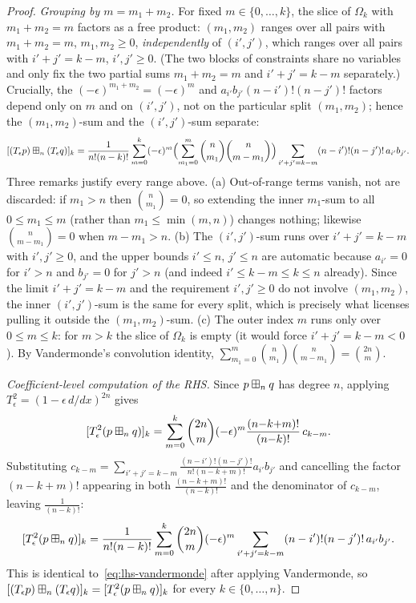 \begin{proof}
\smallskip\noindent\emph{Grouping by $m=m_1+m_2$.}
For fixed $m\in\{0,\dots,k\}$, the slice of $\Omega_k$ with $m_1+m_2=m$ factors as
a free product: $(m_1,m_2)$ ranges over all pairs with $m_1+m_2=m$, $m_1,m_2\ge0$,
\emph{independently} of $(i',j')$, which ranges over all pairs with $i'+j'=k-m$,
$i',j'\ge0$. (The two blocks of constraints share no variables and only fix the
two partial sums $m_1+m_2=m$ and $i'+j'=k-m$ separately.) Crucially, the
$(-\epsilon)^{m_1+m_2}=(-\epsilon)^m$ and $a_{i'}b_{j'}(n-i')!(n-j')!$ factors
depend only on $m$ and on $(i',j')$, not on the particular split $(m_1,m_2)$;
hence the $(m_1,m_2)$-sum and the $(i',j')$-sum separate:
\begin{equation}\label{eq:lhs-vandermonde}
[(T_\epsilon p)\boxplus_n(T_\epsilon q)]_k
= \frac{1}{n!(n-k)!}\sum_{m=0}^k(-\epsilon)^m
   \Bigl(\sum_{m_1=0}^m\binom{n}{m_1}\binom{n}{m-m_1}\Bigr)
   \sum_{i'+j'=k-m}(n-i')!(n-j')!\,a_{i'}b_{j'}.
\end{equation}
Three remarks justify every range above. (a) Out-of-range terms vanish, not are
discarded: if $m_1>n$ then $\binom{n}{m_1}=0$, so extending the inner $m_1$-sum
to all $0\le m_1\le m$ (rather than $m_1\le\min(m,n)$) changes nothing; likewise
$\binom{n}{m-m_1}=0$ when $m-m_1>n$. (b) The $(i',j')$-sum runs over $i'+j'=k-m$
with $i',j'\ge0$, and the upper bounds $i'\le n$, $j'\le n$ are automatic because
$a_{i'}=0$ for $i'>n$ and $b_{j'}=0$ for $j'>n$ (and indeed $i'\le k-m\le k\le n$
already). Since the limit $i'+j'=k-m$ and the requirement $i',j'\ge0$ do not
involve $(m_1,m_2)$, the inner $(i',j')$-sum is the same for every split, which is
precisely what licenses pulling it outside the $(m_1,m_2)$-sum. (c) The outer
index $m$ runs only over $0\le m\le k$: for $m>k$ the slice of $\Omega_k$ is
empty (it would force $i'+j'=k-m<0$). By Vandermonde's convolution identity,
$\sum_{m_1=0}^m\binom{n}{m_1}\binom{n}{m-m_1}=\binom{2n}{m}$.

\smallskip\noindent\textit{Coefficient-level computation of the RHS.}
Since $p\boxplus_n q$ has degree $n$, applying
$T_\epsilon^2=(1-\epsilon\,d/dx)^{2n}$ gives
\[
[T_\epsilon^2(p\boxplus_n q)]_k
= \sum_{m=0}^k\binom{2n}{m}(-\epsilon)^m\frac{(n{-}k{+}m)!}{(n{-}k)!}\,c_{k-m}.
\]
Substituting $c_{k-m}=\sum_{i'+j'=k-m}\frac{(n-i')!(n-j')!}{n!(n-k+m)!}a_{i'}b_{j'}$
and cancelling the factor $(n{-}k{+}m)!$ appearing in both $\frac{(n{-}k{+}m)!}{(n{-}k)!}$
and the denominator of $c_{k-m}$, leaving $\frac{1}{(n{-}k)!}$:
\[
[T_\epsilon^2(p\boxplus_n q)]_k
= \frac{1}{n!(n-k)!}\sum_{m=0}^k\binom{2n}{m}(-\epsilon)^m
  \sum_{i'+j'=k-m}(n-i')!(n-j')!\,a_{i'}b_{j'}.
\]
This is identical to~\eqref{eq:lhs-vandermonde} after applying Vandermonde,
so $[(T_\epsilon p)\boxplus_n(T_\epsilon q)]_k=[T_\epsilon^2(p\boxplus_n q)]_k$ for
every $k\in\{0,\dots,n\}$.


\end{proof}
